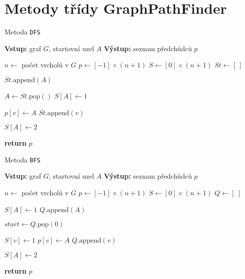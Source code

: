 \section{Metody třídy GraphPathFinder} \label{AppenC}

\begin{algorithm}
    \caption{Metoda \texttt{DFS}}
    \begin{algorithmic}[1]
        \STATE \textbf{Vstup:} graf $G$, startovní uzel $A$
        \STATE \textbf{Výstup:} seznam předchůdců $p$
        
        \STATE $n \gets$ počet vrcholů v $G$
        \STATE $p \gets [-1] \times (n + 1)$ 
        \STATE $S \gets [0] \times (n + 1)$ 
        \STATE $St \gets [~]$ 

        \STATE $St.\text{append}(A)$ 

            \STATE $A \gets St.\text{pop}()$
            \STATE $S[A] \gets 1$

                    \STATE $p[v] \gets A$
                    \STATE $St.\text{append}(v)$
                \ENDIF
            \ENDFOR

            \STATE $S[A] \gets 2$ 
        \ENDWHILE

        \STATE \textbf{return} $p$
    \end{algorithmic}
\end{algorithm}

\begin{algorithm}
    \caption{Metoda \texttt{BFS}}
    \begin{algorithmic}[1]
        \STATE \textbf{Vstup:} graf $G$, startovní uzel $A$
        \STATE \textbf{Výstup:} seznam předchůdců $p$
        
        \STATE $n \gets$ počet vrcholů v $G$
        \STATE $p \gets [-1] \times (n + 1)$ 
        \STATE $S \gets [0] \times (n + 1)$ 
        \STATE $Q \gets [~]$ 

        \STATE $S[A] \gets 1$ 
        \STATE $Q.\text{append}(A)$ 

            \STATE $start \gets Q.\text{pop}(0)$
            
                    \STATE $S[v] \gets 1$
                    \STATE $p[v] \gets A$
                    \STATE $Q.\text{append}(v)$
                \ENDIF
            \ENDFOR

            \STATE $S[A] \gets 2$
        \ENDWHILE

        \STATE \textbf{return} $p$
    \end{algorithmic}
\end{algorithm}

